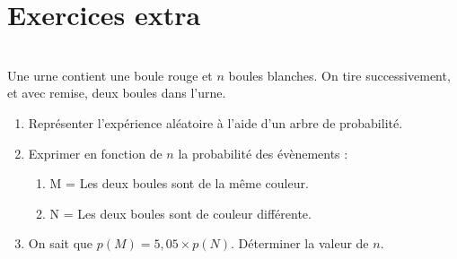 \documentclass[main.tex]{subfiles}
\begin{document}
\newpage


%	 

\newpage  
\pagestyle{empty} %
\onehalfspacing
\section{Exercices extra}


\begin{exercise} \label{chapter03:exercise:modelisation10} \hfill \\
	Une urne contient une boule rouge et $n$ boules blanches. On tire successivement, et avec remise, deux boules dans l'urne.
	\begin{enumerate}[leftmargin=*,label=\alph*)]
			\item Représenter l'expérience aléatoire à l'aide d'un arbre de probabilité.
			\item Exprimer en fonction de $n$ la probabilité des évènements :
			\begin{enumerate}[label=\textbullet,leftmargin=*]
					\item  M = \og Les deux boules sont de la même couleur. \fg{} 
					\item N = \og Les deux boules sont de couleur différente. \fg{}
				\end{enumerate}
			\item On sait que $p(M)=5,05\times p(N)$. Déterminer la valeur de $n$.
		\end{enumerate}
\end{exercise} 
\end{document}
